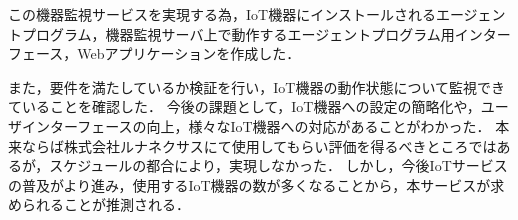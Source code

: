 この機器監視サービスを実現する為，IoT機器にインストールされるエージェントプログラム，機器監視サーバ上で動作するエージェントプログラム用インターフェース，Webアプリケーションを作成した．
\medskip

また，要件を満たしているか検証を行い，IoT機器の動作状態について監視できていることを確認した．
今後の課題として，IoT機器への設定の簡略化や，ユーザインターフェースの向上，様々なIoT機器への対応があることがわかった．
本来ならば株式会社ルナネクサスにて使用してもらい評価を得るべきところではあるが，スケジュールの都合により，実現しなかった．
しかし，今後IoTサービスの普及がより進み，使用するIoT機器の数が多くなることから，本サービスが求められることが推測される．

